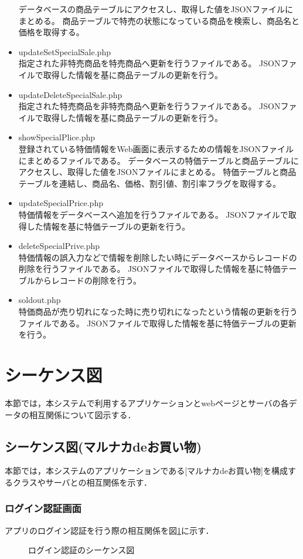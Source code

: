 \documentclass[a4j]{jarticle}
\begin{document}
\begin{itemize}
		データベースの商品テーブルにアクセスし、取得した値をJSONファイルにまとめる。
		商品テーブルで特売の状態になっている商品を検索し、商品名と価格を取得する。
		\item updateSetSpecialSale.php \\
		指定された非特売商品を特売商品へ更新を行うファイルである。
		JSONファイルで取得した情報を基に商品テーブルの更新を行う。
		\item updateDeleteSpecialSale.php \\
		指定された特売商品を非特売商品へ更新を行うファイルである。
		JSONファイルで取得した情報を基に商品テーブルの更新を行う。
		\item showSpecialPlice.php \\
		登録されている特価情報をWeb画面に表示するための情報をJSONファイルにまとめるファイルである。
		データベースの特価テーブルと商品テーブルにアクセスし、取得した値をJSONファイルにまとめる。
		特価テーブルと商品テーブルを連結し、商品名、価格、割引値、割引率フラグを取得する。
		\item updateSpecialPrice.php \\
		特価情報をデータベースへ追加を行うファイルである。
		JSONファイルで取得した情報を基に特価テーブルの更新を行う。
		\item deleteSpecialPrive.php \\
		特価情報の誤入力などで情報を削除したい時にデータベースからレコードの削除を行うファイルである。
		JSONファイルで取得した情報を基に特価テーブルからレコードの削除を行う。
		\item soldout.php \\
		特価商品が売り切れになった時に売り切れになったという情報の更新を行うファイルである。
		JSONファイルで取得した情報を基に特価テーブルの更新を行う。
	\end{itemize}
  \section{シーケンス図}
  本節では，本システムで利用するアプリケーションとwebページとサーバの各データの相互関係について図示する．
  \subsection{シーケンス図(マルナカdeお買い物)}
  本節では，本システムのアプリケーションである[マルナカdeお買い物]を構成するクラスやサーバとの相互関係を示す．
  \subsubsection{ログイン認証画面}
  \label{tabs:AuthenticationUser}
  アプリのログイン認証を行う際の相互関係を図\ref{tab:AuthenticationUser}に示す．
  \begin{figure}[H]
  \begin{center}
  \caption{ログイン認証のシーケンス図}
  \label{tab:AuthenticationUser}
  \end{center}
  \end{figure}
\end{document}
